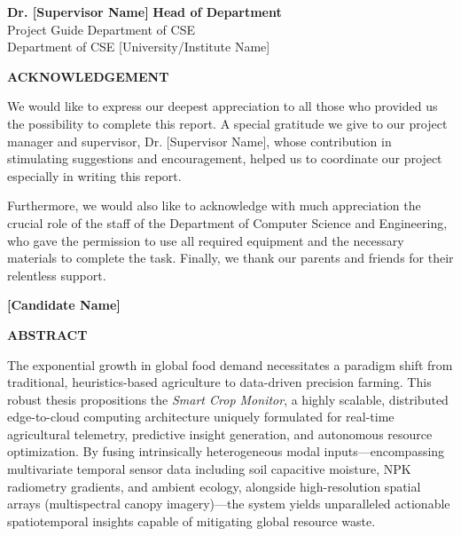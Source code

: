 \documentclass[12pt, a4paper]{report}
\begin{document}
\vspace{3cm}

\noindent\textbf{Dr. [Supervisor Name]} \hfill \textbf{Head of Department} \\
Project Guide \hfill Department of CSE \\
Department of CSE \hfill [University/Institute Name]

\newpage
\thispagestyle{empty}
\vspace*{2cm}
\begin{center}
    \Large \textbf{ACKNOWLEDGEMENT}
\end{center}
\vspace{1cm}
We would like to express our deepest appreciation to all those who provided us the possibility to complete this report. A special gratitude we give to our project manager and supervisor, Dr. [Supervisor Name], whose contribution in stimulating suggestions and encouragement, helped us to coordinate our project especially in writing this report.

Furthermore, we would also like to acknowledge with much appreciation the crucial role of the staff of the Department of Computer Science and Engineering, who gave the permission to use all required equipment and the necessary materials to complete the task. Finally, we thank our parents and friends for their relentless support.

\vspace{2cm}
\begin{flushright}
    \textbf{[Candidate Name]}
\end{flushright}

\newpage
\thispagestyle{empty}
\vspace*{1cm}
\begin{center}
    \Large \textbf{ABSTRACT}
\end{center}
\vspace{1cm}
The exponential growth in global food demand necessitates a paradigm shift from traditional, heuristics-based agriculture to data-driven precision farming. This robust thesis propositions the \textit{Smart Crop Monitor}, a highly scalable, distributed edge-to-cloud computing architecture uniquely formulated for real-time agricultural telemetry, predictive insight generation, and autonomous resource optimization. By fusing intrinsically heterogeneous modal inputs—encompassing multivariate temporal sensor data including soil capacitive moisture, NPK radiometry gradients, and ambient ecology, alongside high-resolution spatial arrays (multispectral canopy imagery)—the system yields unparalleled actionable spatiotemporal insights capable of mitigating global resource waste.
\end{document}
